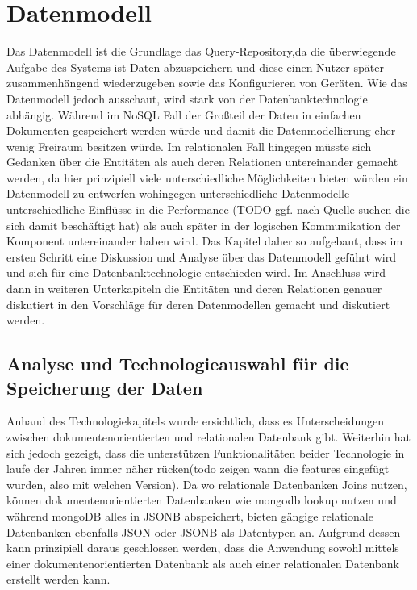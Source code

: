 \newpage











\section{Datenmodell}\label{sec:Datenmodell}

Das Datenmodell ist die Grundlage das Query-Repository,da die überwiegende Aufgabe des Systems ist Daten abzuspeichern und diese einen Nutzer später zusammenhängend wiederzugeben sowie das Konfigurieren von Geräten.
Wie das Datenmodell jedoch ausschaut, wird stark von der Datenbanktechnologie abhängig. Während im NoSQL Fall der Großteil der Daten in einfachen Dokumenten gespeichert werden würde und damit die Datenmodellierung eher wenig Freiraum besitzen würde. Im relationalen Fall hingegen müsste sich Gedanken über die Entitäten als auch deren Relationen untereinander gemacht werden, da hier prinzipiell viele unterschiedliche Möglichkeiten bieten würden ein Datenmodell zu entwerfen wohingegen unterschiedliche Datenmodelle unterschiedliche Einflüsse in die Performance (TODO ggf. nach Quelle suchen die sich damit beschäftigt hat) als auch später in der logischen Kommunikation der Komponent untereinander haben wird.
Das Kapitel daher so aufgebaut, dass im ersten Schritt eine Diskussion und Analyse über das Datenmodell geführt wird und sich für eine Datenbanktechnologie entschieden wird.
Im Anschluss wird dann in weiteren Unterkapiteln die Entitäten und deren Relationen genauer diskutiert in den Vorschläge für deren Datenmodellen gemacht und diskutiert werden.



\subsection{Analyse und Technologieauswahl für die Speicherung der Daten}
Anhand des Technologiekapitels wurde ersichtlich, dass es Unterscheidungen zwischen dokumentenorientierten und relationalen Datenbank gibt.
Weiterhin hat sich jedoch gezeigt, dass die unterstützen Funktionalitäten beider Technologie in laufe der Jahren immer näher rücken(todo zeigen wann die features eingefügt wurden, also mit welchen Version).
Da wo relationale Datenbanken Joins nutzen, können dokumentenorientierten Datenbanken wie mongodb lookup nutzen und während mongoDB alles in JSONB abspeichert, bieten gängige relationale Datenbanken ebenfalls JSON oder JSONB als Datentypen an. Aufgrund dessen kann prinzipiell daraus geschlossen werden, dass die Anwendung sowohl mittels einer dokumentenorientierten Datenbank als auch einer relationalen Datenbank erstellt werden kann. 




